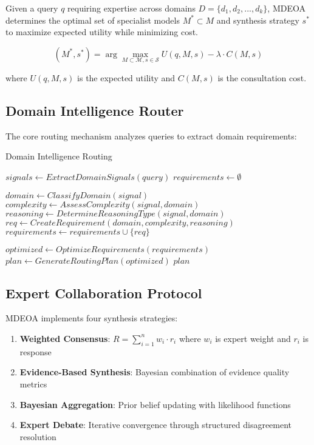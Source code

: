 \documentclass[12pt,a4paper]{article}
\begin{document}
Given a query $q$ requiring expertise across domains $D = \{d_1, d_2, ..., d_k\}$, MDEOA determines the optimal set of specialist models $M^* \subset M$ and synthesis strategy $s^*$ to maximize expected utility while minimizing cost.

\begin{equation}
(M^*, s^*) = \arg\max_{M \subset \mathcal{M}, s \in \mathcal{S}} U(q, M, s) - \lambda \cdot C(M, s)
\end{equation}

where $U(q, M, s)$ is the expected utility and $C(M, s)$ is the consultation cost.

\subsection{Domain Intelligence Router}

The core routing mechanism analyzes queries to extract domain requirements:

\begin{algorithm}[H]
\caption{Domain Intelligence Routing}
\begin{algorithmic}[1]
    \State $signals \leftarrow ExtractDomainSignals(query)$
    \State $requirements \leftarrow \emptyset$
    
        \State $domain \leftarrow ClassifyDomain(signal)$
        \State $complexity \leftarrow AssessComplexity(signal, domain)$
        \State $reasoning \leftarrow DetermineReasoningType(signal, domain)$
        \State $req \leftarrow CreateRequirement(domain, complexity, reasoning)$
        \State $requirements \leftarrow requirements \cup \{req\}$
    \EndFor
    
    \State $optimized \leftarrow OptimizeRequirements(requirements)$
    \State $plan \leftarrow GenerateRoutingPlan(optimized)$
    \State \Return $plan$
\EndFunction
\end{algorithmic}
\end{algorithm}

\subsection{Expert Collaboration Protocol}

MDEOA implements four synthesis strategies:

\begin{enumerate}
\item \textbf{Weighted Consensus}: $R = \sum_{i=1}^{n} w_i \cdot r_i$ where $w_i$ is expert weight and $r_i$ is response
\item \textbf{Evidence-Based Synthesis}: Bayesian combination of evidence quality metrics
\item \textbf{Bayesian Aggregation}: Prior belief updating with likelihood functions
\item \textbf{Expert Debate}: Iterative convergence through structured disagreement resolution
\end{enumerate}
\end{document}
